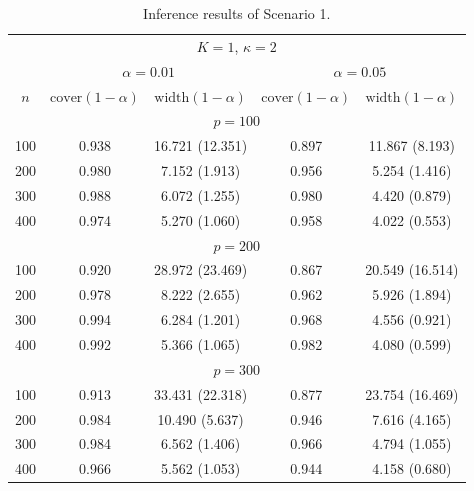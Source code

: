 \documentclass[11pt]{article}
\theoremstyle{plain}
\theoremstyle{definition}
\begin{document}
\begin{table}[t]
\centering
\caption{Inference results of Scenario 1. }
\begin{tabular}{ccccc}
\hline
\multicolumn{5}{c}{$K = 1$, $\kappa = 2$} \\
 & \multicolumn{2}{c}{$\alpha = 0.01$} & \multicolumn{2}{c}{$\alpha = 0.05$} \\
$n$   & $\mathrm{cover}(1-\alpha)$ & $\mathrm{width}(1-\alpha)$ & $\mathrm{cover}(1-\alpha)$ & $\mathrm{width}(1-\alpha)$ \\ \hline
\multicolumn{5}{c}{$p = 100$}                                                                             \\
100 & 0.938            & 16.721 (12.351)  & 0.897            & 11.867 (8.193) \\
200 & 0.980            & 7.152 (1.913)  & 0.956    & 5.254 (1.416)  \\
300 & 0.988            & 6.072 (1.255)  & 0.980    & 4.420 (0.879) \\
400 & 0.974            & 5.270 (1.060)  & 0.958    & 4.022 (0.553) \\
\multicolumn{5}{c}{$p = 200$}                                                                             \\
100 & 0.920            & 28.972 (23.469) & 0.867 & 20.549 (16.514) \\
200 & 0.978            & 8.222 (2.655)  & 0.962  & 5.926 (1.894)  \\
300 & 0.994            & 6.284 (1.201)  & 0.968  & 4.556 (0.921)  \\
400 & 0.992            & 5.366 (1.065)  & 0.982    & 4.080 (0.599) \\
\multicolumn{5}{c}{$p = 300$}                                                                             \\
100 & 0.913            & 33.431 (22.318)   & 0.877    & 23.754 (16.469) \\
200 & 0.984            & 10.490 (5.637)  & 0.946    & 7.616 (4.165) \\
300 & 0.984            & 6.562 (1.406)  & 0.966   & 4.794 (1.055) \\
400 & 0.966            & 5.562 (1.053)  & 0.944    & 4.158 (0.680) \\ \hline
\end{tabular}
\label{tab:sce1_2}
\end{table}
\end{document}
